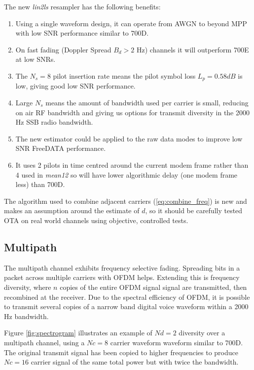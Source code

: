 \documentclass{article}
\begin{document}
The new \emph{lin2ls} resampler has the following benefits:
\begin{enumerate}
\item Using a single waveform design, it can operate from AWGN to beyond MPP with low SNR performance similar to 700D.
\item On fast fading (Doppler Spread $B_d>2$ Hz) channels it will outperform 700E at low SNRs.
\item The $N_s=8$ pilot insertion rate means the pilot symbol loss $L_p=0.58 \si{dB}$ is low, giving good low SNR performance.
\item Large $N_s$ means the amount of bandwidth used per carrier is small, reducing on air RF bandwidth and giving us options for transmit diversity in the 2000 Hz SSB radio bandwidth.
\item The new estimator could be applied to the raw data modes to improve low SNR FreeDATA performance.
\item It uses 2 pilots in time centred around the current modem frame rather than 4 used in \emph{mean12} so will have lower algorithmic delay (one modem frame less) than 700D.
\end{enumerate}	

The algorithm used to combine adjacent carriers (\ref{eq:combine_freq}) is new and makes an assumption around the estimate of $d$, so it should be carefully tested OTA on real world channels using objective, controlled tests.

\subsection{Multipath}

The multipath channel exhibits frequency selective fading.  Spreading bits in a packet across multiple carriers with OFDM helps.  Extending this is frequency diversity, where $n$ copies of the entire OFDM signal signal are transmitted, then recombined at the receiver.  Due to the spectral efficiency of OFDM, it is possible to transmit several copies of a narrow band digital voice waveform within a 2000 Hz bandwidth.

Figure \ref{fig:spectrogram} illustrates an example of $Nd=2$ diversity over a multipath channel, using a $Nc=8$ carrier waveform waveform similar to 700D.  The original transmit signal has been copied to higher frequencies to produce $Nc=16$ carrier signal of the same total power but with twice the bandwidth.
\end{document}
